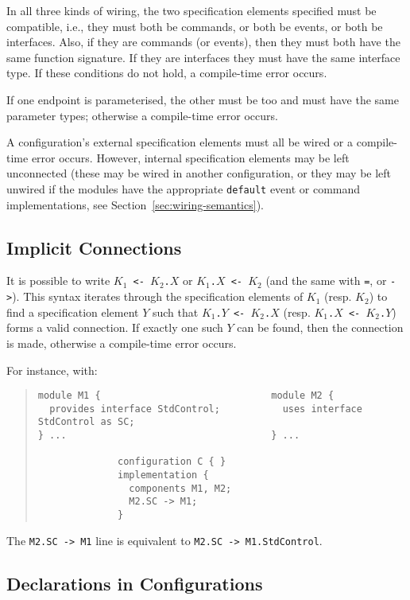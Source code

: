 \documentclass[11pt,letterpaper]{article}
\newcommand{\kw}[1]{{\tt #1}}
\newcommand{\code}[1]{{\tt #1}}
\begin{document}
In all three kinds of wiring, the two specification elements specified must
be compatible, i.e., they must both be commands, or both be events, or both
be interfaces. Also, if they are commands (or events), then they
must both have the same function signature. If they are interfaces
they must have the same interface type. If these conditions do not hold,
a compile-time error occurs.

If one endpoint is parameterised, the other must be too and must have the
same parameter types; otherwise a compile-time error occurs.

A configuration's external specification elements must all be wired or
a compile-time error occurs. However, internal specification elements
may be left unconnected (these may be wired in another configuration,
or they may be left unwired if the modules have the appropriate
\kw{default} event or command implementations, see
Section~\ref{sec:wiring-semantics}).

\subsection{Implicit Connections}
\label{sec:implicit}

It is possible to write \code{$K_1$ <- $K_2$.$X$} or \code{$K_1$.$X$ <-
$K_2$} (and the same with \kw{=}, or \kw{->}). This syntax iterates through
the specification elements of $K_1$ (resp. $K_2$) to find a specification
element $Y$ such that \code{$K_1$.$Y$ <- $K_2$.$X$} (resp. \code{$K_1$.$X$
<- $K_2$.$Y$}) forms a valid connection. If exactly one such $Y$ can
be found, then the connection is made, otherwise a compile-time error
occurs.

For instance, with:
\begin{quote} \begin{verbatim}
module M1 {                              module M2 {
  provides interface StdControl;           uses interface StdControl as SC;
} ...                                    } ...

              configuration C { }
              implementation {
                components M1, M2;
                M2.SC -> M1;
              }
\end{verbatim} \end{quote}
The \code{M2.SC -> M1} line is equivalent to \code{M2.SC -> M1.StdControl}.

\subsection{Declarations in Configurations}
\label{sec:config-decls}
\end{document}
